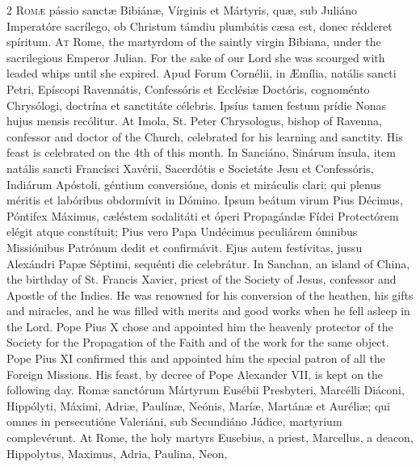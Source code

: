 \begin{paracol}{2}
\lettrine[lines=2]{R}{omæ} pássio sanctæ 
 Bibiánæ, Vírginis et Mártyris, quæ, sub Juliáno Imperatóre sacrílego, ob 
 Christum támdiu plumbátis cæsa est, donec rédderet spíritum.
\switchcolumn
{}
\lettrine[lines=2]{A}{t} Rome, the martyrdom of the 
 saintly virgin Bibiana, under the sacrilegious Emperor Julian. For the 
 sake of our Lord she was scourged with leaded whips until she expired.
\switchcolumn*
{}
Apud Forum Cornélii, in 
 Æmília, natális sancti Petri, Epíscopi Ravennátis, Confessóris et Ecclésiæ 
 Doctóris, cognoménto Chrysólogi, doctrína et sanctitáte célebris. 
 Ipsíus tamen festum prídie Nonas hujus mensis recólitur.
\switchcolumn
{}
At Imola, St. Peter Chrysologus, 
 bishop of Ravenna, confessor and doctor of the Church, celebrated for his 
 learning and sanctity. His feast is celebrated on the 4th of this 
 month.
\switchcolumn*
{}
In Sanciáno, Sinárum ínsula, item natális sancti Francísci Xavérii, Sacerdótis e Societáte Jesu 
 et Confessóris, Indiárum Apóstoli, géntium conversióne, donis et miráculis 
 clari; qui plenus méritis et labóribus obdormívit in Dómino. Ipsum 
 beátum virum Pius Décimus, Póntifex Máximus, cæléstem sodalitáti et óperi 
 Propagándæ Fídei Protectórem elégit atque constítuit; Pius vero Papa 
 Undécimus peculiárem ómnibus Missiónibus Patrónum dedit et confirmávit. 
 Ejus autem festívitas, jussu Alexándri Papæ Séptimi, sequénti die celebrátur.
\switchcolumn
{}
In Sanchan, an island of China, the 
 birthday of St. Francis Xavier, priest of the Society of Jesus, confessor 
 and Apostle of the Indies. He was renowned for his conversion of the 
 heathen, his gifts and miracles, and he was filled with merits and good 
 works when he fell asleep in the Lord. Pope Pius X chose and appointed 
 him the heavenly protector of the Society for the Propagation of the Faith 
 and of the work for the same object. Pope Pius XI confirmed this and 
 appointed him the special patron of all the Foreign Missions. His 
 feast, by decree of Pope Alexander VII, is kept on the following day.
\switchcolumn*
{}
Romæ sanctórum Mártyrum 
 Eusébii Presbyteri, Marcélli Diáconi, Hippólyti, Máximi, Adriæ, Paulínæ, 
 Neónis, Maríæ, Martánæ et Auréliæ; qui omnes in persecutióne Valeriáni, sub 
 Secundiáno Júdice, martyrium complevérunt.
\switchcolumn
{}
At Rome, the holy martyrs Eusebius, 
 a priest, Marcellus, a deacon, Hippolytus, Maximus, Adria, Paulina, Neon, 

\end{paracol}
